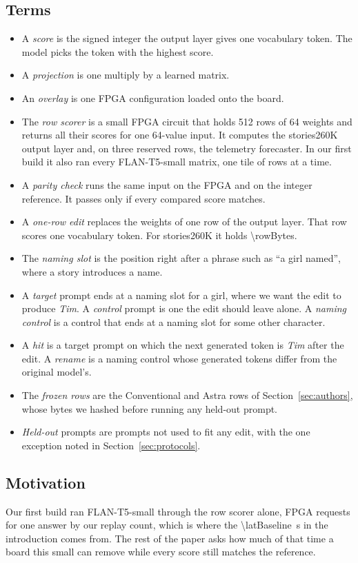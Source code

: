 \documentclass[conference,10pt,letterpaper]{IEEEtran}
\newcommand{\seconds}[1]{\SI{#1}{\second}}
\newcommand{\flan}{\mbox{FLAN-T5-small}}
\newcommand{\stories}{\mbox{stories260K}}
\begin{document}
\subsection{Terms}
\begin{itemize}
\item A \emph{score} is the signed integer the output layer gives one vocabulary token. The model picks the token with the highest score.
\item A \emph{projection} is one multiply by a learned matrix.
\item An \emph{overlay} is one FPGA configuration loaded onto the board.
\item The \emph{row scorer} is a small FPGA circuit that holds 512 rows of 64 weights and returns all their scores for one 64-value input. It computes the \stories{} output layer and, on three reserved rows, the telemetry forecaster. In our first build it also ran every \flan{} matrix, one tile of rows at a time.
\item A \emph{parity check} runs the same input on the FPGA and on the integer reference. It passes only if every compared score matches.
\item A \emph{one-row edit} replaces the weights of one row of the output layer. That row scores one vocabulary token. For \stories{} it holds \SI{\rowBytes}{\byte}.
\item The \emph{naming slot} is the position right after a phrase such as ``a girl named'', where a story introduces a name.
\item A \emph{target} prompt ends at a naming slot for a girl, where we want the edit to produce \emph{Tim}. A \emph{control} prompt is one the edit should leave alone. A \emph{naming control} is a control that ends at a naming slot for some other character.
\item A \emph{hit} is a target prompt on which the next generated token is \emph{Tim} after the edit. A \emph{rename} is a naming control whose \extNewTokens{} generated tokens differ from the original model's.
\item The \emph{frozen rows} are the Conventional and Astra rows of Section~\ref{sec:authors}, whose bytes we hashed before running any held-out prompt.
\item \emph{Held-out} prompts are prompts not used to fit any edit, with the one exception noted in Section~\ref{sec:protocols}.
\end{itemize}

\subsection{Motivation}
Our first build ran \flan{} through the row scorer alone, \floorSubmissions{} FPGA requests for one answer by our replay count, which is where the \seconds{\latBaseline} in the introduction comes from. The rest of the paper asks how much of that time a board this small can remove while every score still matches the reference.
\end{document}
